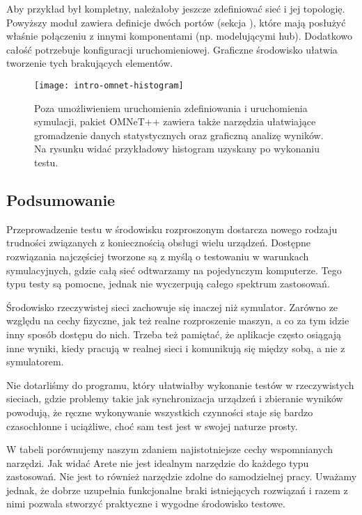 \documentclass[00-praca-magisterska.tex]{subfiles}
\begin{document}
Aby przykład był kompletny, należałoby jeszcze zdefiniować sieć i jej
topologię.  Powyższy moduł zawiera definicje dwóch portów (sekcja
), które mają posłużyć właśnie połączeniu z innymi komponentami
(np. modelującymi hub). Dodatkowo całość potrzebuje konfiguracji
uruchomieniowej. Graficzne środowisko ułatwia tworzenie tych brakujących elementów.

\begin{figure}
\begin{center}
\leavevmode
\texttt{[image: intro-omnet-histogram]}
\end{center}
\caption{Poza umożliwieniem uruchomienia zdefiniowania i uruchomienia
symulacji, pakiet OMNeT++ zawiera także narzędzia ułatwiające gromadzenie
danych statystycznych oraz graficzną analizę wyników. Na rysunku widać
przykładowy histogram uzyskany po wykonaniu testu.}
\label{fig:intro-omnet-histogram}
\end{figure}


\subsection{Podsumowanie}

Przeprowadzenie testu w środowisku rozproszonym dostarcza nowego rodzaju
trudności związanych z koniecznością obsługi wielu urządzeń. Dostępne
rozwiązania najczęściej tworzone są z myślą o testowaniu w warunkach
symulacyjnych, gdzie całą sieć odtwarzamy na pojedynczym komputerze. Tego typu
testy są pomocne, jednak nie wyczerpują całego spektrum zastosowań.

Środowisko rzeczywistej sieci zachowuje się inaczej niż symulator. Zarówno ze
względu na cechy fizyczne, jak też realne rozproszenie maszyn, a co za tym
idzie inny sposób dostępu do nich. Trzeba też pamiętać, że aplikacje często
osiągają inne wyniki, kiedy pracują w realnej sieci i komunikują się między
sobą, a nie z symulatorem.

Nie dotarliśmy do programu, który ułatwiałby wykonanie testów w
rzeczywistych sieciach, gdzie problemy takie jak synchronizacja urządzeń i
zbieranie wyników powodują, że ręczne wykonywanie wszystkich czynności staje
się bardzo czasochłonne i uciążliwe, choć sam test jest w swojej naturze prosty.

W tabeli  porównujemy naszym zdaniem najistotniejsze cechy
wspomnianych narzędzi. Jak widać Arete nie jest idealnym narzędzie do każdego
typu zastosowań. Nie jest to również narzędzie zdolne do samodzielnej pracy.
Uważamy jednak, że dobrze uzupełnia funkcjonalne braki istniejących rozwiązań i
razem z nimi pozwala stworzyć praktyczne i wygodne środowisko testowe.
\end{document}
